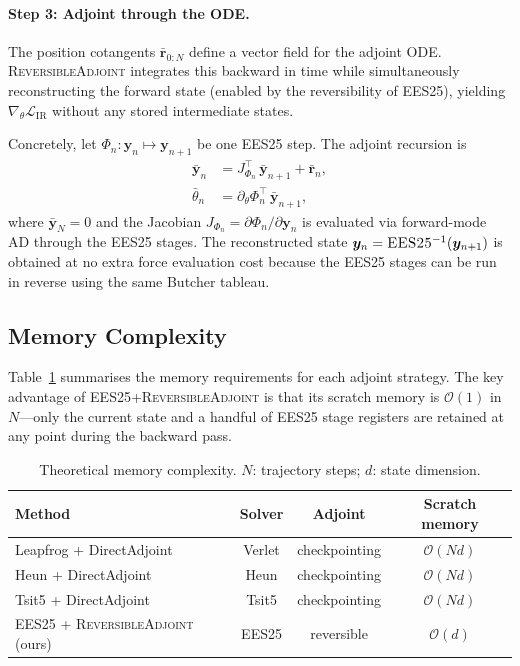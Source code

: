 \documentclass{article}
\newcommand{\EES}{\textsc{EES25}}
\newcommand{\RevAdj}{\textsc{ReversibleAdjoint}}
\begin{document}
\paragraph{Step 3: Adjoint through the ODE.}
The position cotangents $\bar{\bm{r}}_{0:N}$ define a vector field for the
adjoint ODE.  \RevAdj{} integrates this backward in time while simultaneously
reconstructing the forward state (enabled by the reversibility of \EES{}),
yielding $\nabla_\theta\mathcal{L}_\mathrm{IR}$ without any stored
intermediate states.

Concretely, let $\Phi_n: \bm{y}_n \mapsto \bm{y}_{n+1}$ be one \EES{} step.
The adjoint recursion is
\begin{align}
  \bar{\bm{y}}_n &= J_{\Phi_n}^\top\,\bar{\bm{y}}_{n+1} + \bar{\bm{r}}_n, \\
  \bar{\theta}_n &= \partial_\theta\Phi_n^\top\,\bar{\bm{y}}_{n+1},
\end{align}
where $\bar{\bm{y}}_N = 0$ and the Jacobian $J_{\Phi_n} = \partial\Phi_n/\partial\bm{y}_n$
is evaluated via forward-mode AD through the \EES{} stages.  The reconstructed
state $\bm{y}_n = \EES{}^{-1}(\bm{y}_{n+1})$ is obtained at no extra force
evaluation cost because the \EES{} stages can be run in reverse using the
same Butcher tableau.

\subsection{Memory Complexity}

Table~\ref{tab:memory} summarises the memory requirements for each adjoint
strategy.  The key advantage of \EES{}+\RevAdj{} is that its scratch memory
is $\mathcal{O}(1)$ in $N$---only the current state and a handful of \EES{}
stage registers are retained at any point during the backward pass.

\begin{table}[t]
\centering
\caption{Theoretical memory complexity. $N$: trajectory steps; $d$: state dimension.}
\label{tab:memory}
\begin{tabular}{lccc}
\toprule
Method & Solver & Adjoint & Scratch memory \\
\midrule
Leapfrog + DirectAdjoint   & Verlet & checkpointing & $\mathcal{O}(N d)$ \\
Heun + DirectAdjoint       & Heun   & checkpointing & $\mathcal{O}(N d)$ \\
Tsit5 + DirectAdjoint      & Tsit5  & checkpointing & $\mathcal{O}(N d)$ \\
\EES{} + \RevAdj{} (ours) & \EES{} & reversible    & $\mathcal{O}(d)$   \\
\bottomrule
\end{tabular}
\end{table}
\end{document}
